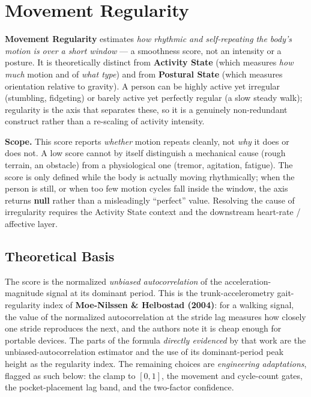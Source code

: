 \chapter{Movement Regularity}

\noindent\textbf{Movement Regularity} estimates \textit{how rhythmic and self-repeating
the body's motion is over a short window} --- a smoothness score, not an intensity or a
posture. It is theoretically distinct from \textbf{Activity State} (which measures
\textit{how much} motion and of \textit{what type}) and from \textbf{Postural State}
(which measures orientation relative to gravity). A person can be highly active yet
irregular (stumbling, fidgeting) or barely active yet perfectly regular (a slow steady
walk); regularity is the axis that separates these, so it is a genuinely non-redundant
construct rather than a re-scaling of activity intensity.

\begin{callout}
\textbf{Scope.} This score reports \textit{whether} motion repeats cleanly, not \textit{why}
it does or does not. A low score cannot by itself distinguish a mechanical cause (rough
terrain, an obstacle) from a physiological one (tremor, agitation, fatigue). The score is
only defined while the body is actually moving rhythmically; when the person is still, or
when too few motion cycles fall inside the window, the axis returns \textbf{null} rather
than a misleadingly ``perfect'' value. Resolving the cause of irregularity requires the
Activity State context and the downstream heart-rate / affective layer.
\end{callout}

\section{Theoretical Basis}

The score is the normalized \emph{unbiased autocorrelation} of the acceleration-magnitude
signal at its dominant period. This is the trunk-accelerometry gait-regularity index of
\textbf{Moe-Nilssen \& Helbostad (2004)}: for a walking signal, the value of the normalized
autocorrelation at the stride lag measures how closely one stride reproduces the next, and
the authors note it is cheap enough for portable devices. The parts of the formula
\emph{directly evidenced} by that work are the unbiased-autocorrelation estimator and the
use of its dominant-period peak height as the regularity index. The remaining choices are
\emph{engineering adaptations}, flagged as such below: the clamp to $[0,1]$, the movement
and cycle-count gates, the pocket-placement lag band, and the two-factor confidence.

